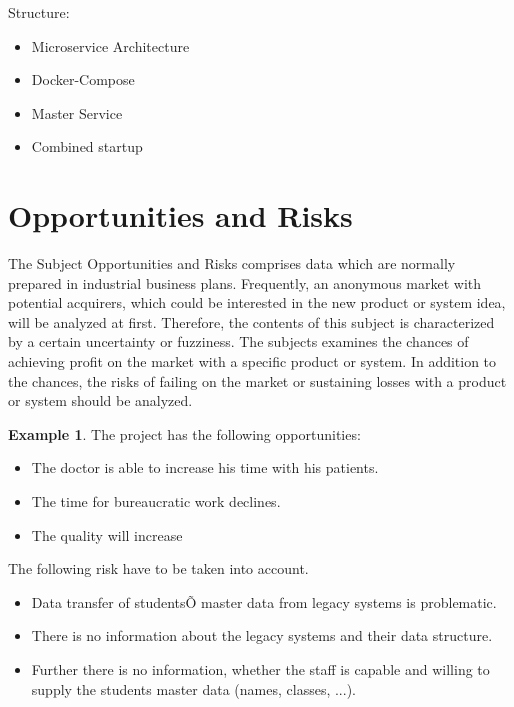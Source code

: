 \documentclass[12pt]{article}
\theoremstyle{definition}
\newtheorem{example}{Example}
\newenvironment{explanation}{%
   \setlength{\parindent}{0pt}
   \itshape
   \color{blue}
}{}
\begin{document}
\newline
Structure:
\begin{itemize}
    \item Microservice Architecture
    \item Docker-Compose
    \item Master Service
    \item Combined startup
\end{itemize}

\pagebreak

\section{Opportunities and Risks}
\begin{explanation}
The Subject Opportunities and Risks comprises data which are normally prepared in industrial business plans. Frequently, an anonymous market with potential acquirers, which could be interested in the new product or system idea, will be analyzed at first. Therefore, the contents of this subject is characterized by a certain uncertainty or fuzziness. The subjects examines the chances of achieving profit on the market with a specific product or system. In addition to the chances, the risks of failing on the market or sustaining losses with a product or system should be analyzed.
\end{explanation}

\begin{example}
The project has the following opportunities:
\begin{itemize}
\item The doctor is able to increase his time with his patients.
\item The time for bureaucratic work declines.
\item The quality will increase
\end{itemize}

The following risk have to be taken into account.
\begin{itemize}
\item Data transfer of studentsÕ master data from legacy systems is problematic.
\item There is no information about the legacy systems and their data structure.
\item Further there is no information, whether the staff is capable and willing to supply the students master data (names, classes, ...).
\end{itemize}

\end{example}
\end{document}
